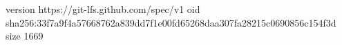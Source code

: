 version https://git-lfs.github.com/spec/v1
oid sha256:33f7a9f4a57668762a839dd7f1e00fd65268daa307fa28215c0690856c154f3d
size 1669
